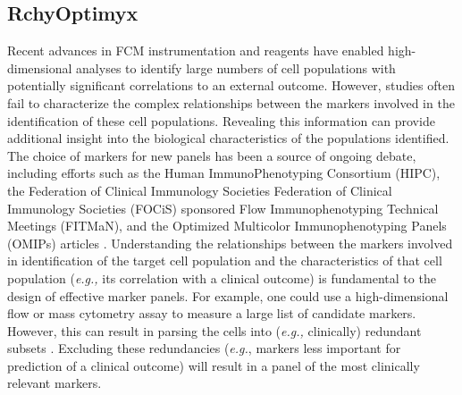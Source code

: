 \subsection{RchyOptimyx}
Recent advances in FCM instrumentation and reagents  have enabled high-dimensional analyses to identify large numbers of  cell populations with potentially significant correlations to an external outcome.
However,  studies often fail to characterize the complex relationships between the markers involved in the  identification of these cell populations.
Revealing this information can provide additional insight into the biological characteristics of the populations identified.
The choice of markers for new panels has been a source of ongoing debate, including efforts such as the Human ImmunoPhenotyping Consortium (HIPC), the Federation of Clinical Immunology Societies Federation of Clinical Immunology Societies (FOCiS) sponsored Flow Immunophenotyping Technical Meetings (FITMaN), and the Optimized Multicolor Immunophenotyping Panels (OMIPs) articles \cite{Maecker2012Standardizing,roederer2010omips,mahnke2010omip,chattopadhyay2010omip,wei2011omip,biancotto2011omip,foulds2012omip,murdoch2012omip,eller2012omip,zuleger2012omip,lamoreaux2012omip,preijers2012omip}.
Understanding the relationships between the markers involved in identification of the target cell population and the characteristics of that cell population (\emph{e.g.,} its correlation with a clinical outcome) is fundamental to the design of effective marker panels. 
For example, one could use a high-dimensional flow or mass cytometry assay to measure a large list of candidate markers.
However, this can result in parsing the cells into (\emph{e.g.,} clinically) redundant subsets \cite{bendall2012deep}.
Excluding these redundancies (\emph{e.g.}, markers less important for prediction of a clinical outcome) will result in a panel of the most clinically relevant markers.


